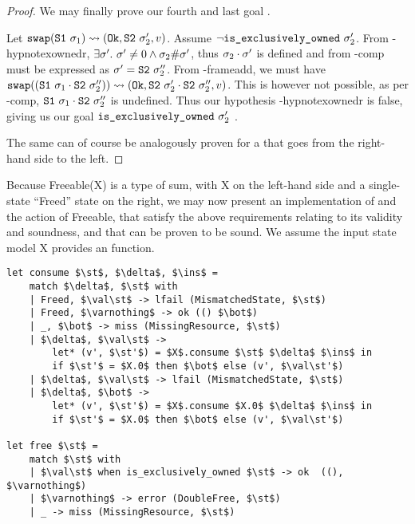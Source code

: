 \begin{proof}

We may finally prove our fourth and last goal .

\begin{hypvlist}
	 Let $\texttt{swap}(\texttt{S1}~\sigma_1)\rightsquigarrow(\texttt{Ok},\texttt{S2}~\sigma_2',v)$.
	 Assume $\neg\texttt{is\_exclusively\_owned}~\sigma_2'$.
	 From \hyp{hypnotexownedr}, $\exists \sigma'.~\sigma'\neq0 \land \sigma_2\#\sigma'$, thus $\sigma_2\cdot\sigma'$ is defined and from \hyp{comp} must be expressed as $\sigma'=\texttt{S2}~\sigma_2''$.
	 From \hyp{frameadd}, we must have $\texttt{swap}((\texttt{S1}~\sigma_1\cdot\texttt{S2}~\sigma_2''))\rightsquigarrow(\texttt{Ok},\texttt{S2}~\sigma_2'\cdot\texttt{S2}~\sigma_2'',v)$. This is however not possible, as per \hyp{comp}, $\texttt{S1}~\sigma_1\cdot\texttt{S2}~\sigma_2''$ is undefined. Thus our hypothesis \hyp{hypnotexownedr} is false, giving us our goal $\texttt{is\_exclusively\_owned}~\sigma_2'$ .
	
\end{hypvlist}

The same can of course be analogously proven for a \swap that goes from the right-hand side to the left.

\end{proof}

Because Freeable(X) is a type of sum, with X on the left-hand side and a single-state ``Freed'' state on the right, we may now present an implementation of  and the  action of Freeable, that satisfy the above requirements relating to its validity and soundness, and that can be proven to be sound. We assume the input state model X provides an \isexowned function.

\begin{lstlisting}
let consume $\st$, $\delta$, $\ins$ =
	match $\delta$, $\st$ with
	| Freed, $\val\st$ -> lfail (MismatchedState, $\st$)
	| Freed, $\varnothing$ -> ok (() $\bot$)
	| _, $\bot$ -> miss (MissingResource, $\st$)
	| $\delta$, $\val\st$ ->
		let* (v', $\st'$) = $X$.consume $\st$ $\delta$ $\ins$ in
		if $\st'$ = $X.0$ then $\bot$ else (v', $\val\st'$)
	| $\delta$, $\val\st$ -> lfail (MismatchedState, $\st$)
	| $\delta$, $\bot$ -> 
		let* (v', $\st'$) = $X$.consume $X.0$ $\delta$ $\ins$ in
		if $\st'$ = $X.0$ then $\bot$ else (v', $\val\st'$)

let free $\st$ =
	match $\st$ with
	| $\val\st$ when is_exclusively_owned $\st$ -> ok  ((), $\varnothing$)
	| $\varnothing$ -> error (DoubleFree, $\st$)
	| _ -> miss (MissingResource, $\st$)
\end{lstlisting}

